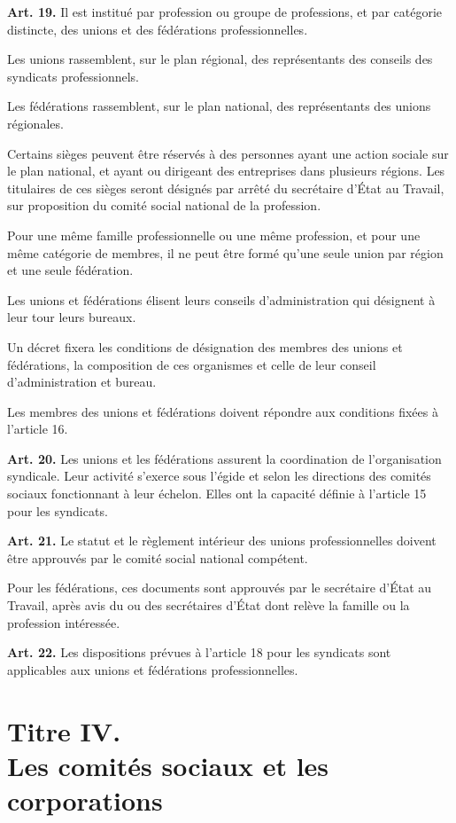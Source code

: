 \documentclass[french,twoside]{book} %
\newcommand{\labelchar}[1]{\textbf{\color{rubric} #1}}
\begin{document}
\noindent \labelchar{Art. 19.} Il est institué par profession ou groupe de professions, et par catégorie distincte, des unions et des fédérations professionnelles.\par
Les unions rassemblent, sur le plan régional, des représentants des conseils des syndicats professionnels.\par
Les fédérations rassemblent, sur le plan national, des représentants des unions régionales.\par
Certains sièges peuvent être réservés à des personnes ayant une action sociale sur le plan national, et ayant ou dirigeant des entreprises dans plusieurs régions. Les titulaires de ces sièges seront désignés par arrêté du secrétaire d’État au Travail, sur proposition du comité social national de la profession.\par
Pour une même famille professionnelle ou une même profession, et pour une même catégorie de membres, il ne peut être formé qu’une seule union par région et une seule fédération.\par
Les unions et fédérations élisent leurs conseils d’administration qui désignent à leur tour leurs bureaux.\par
Un décret fixera les conditions de désignation des membres des unions et fédérations, la composition de ces organismes et celle de leur conseil d’administration et bureau.\par
Les membres des unions et fédérations doivent répondre aux conditions fixées à l’article 16.\par
\bigbreak
\noindent \labelchar{Art. 20.} Les unions et les fédérations assurent la coordination de l’organisation syndicale. Leur activité s’exerce sous l’égide et selon les directions des comités sociaux fonctionnant à leur échelon. Elles ont la capacité définie à l’article 15 pour les syndicats.\par
\bigbreak
\noindent \labelchar{Art. 21.} Le statut et le règlement intérieur des unions professionnelles doivent être approuvés par le comité social national compétent.\par
Pour les fédérations, ces documents sont approuvés par le secrétaire d’État au Travail, après avis du ou des secrétaires d’État dont relève la famille ou la profession intéressée.\par
\bigbreak
\noindent \labelchar{Art. 22.} Les dispositions prévues à l’article 18 pour les syndicats sont applicables aux unions et fédérations professionnelles.

\section[{Titre IV. Les comités sociaux et les corporations}]{Titre IV. \\
Les comités sociaux et les corporations}
\renewcommand{\leftmark}{Titre IV. \\
Les comités sociaux et les corporations}
\end{document}
